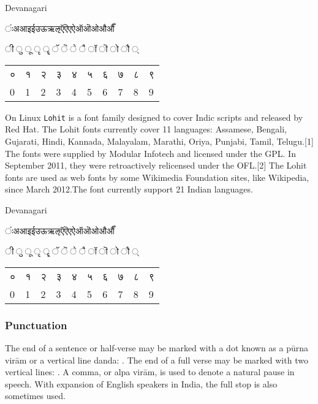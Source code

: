 \begin{scriptexample}[]{Devanagari}
{\begin{center}\parindent0pt\devanagari

ंःअआइईउऊऋऌऍऎएऐऑऒओऔऔँ \par 

ी	ु	ू	ृ	ॄ	ॅ	ॆ	े	ै	ॉ	ॊ	ो	ौ	्	\par

\bigskip		
\begin{tabular}{lll lll lll l}
०	&१	&२	&३	&४	&५	&६	&७	&८	&९\\
0	&1	&2	&3	&4	&5	&6	&7	&8	&9\\
\end{tabular}
\end{center}	
}
\end{scriptexample}


On Linux \texttt{Lohit} is a font family designed to cover Indic scripts and released by Red Hat. The Lohit fonts currently cover 11 languages: Assamese, Bengali, Gujarati, Hindi, Kannada, Malayalam, Marathi, Oriya, Punjabi, Tamil, Telugu.[1] The fonts were supplied by Modular Infotech and licensed under the GPL. In September 2011, they were retroactively relicensed under the OFL.[2] The Lohit fonts are used as web fonts by some Wikimedia Foundation sites, like Wikipedia, since March 2012.The font currently support 21 Indian languages. 



\begin{scriptexample}[]{Devanagari}
\begin{center}\parindent0pt\devanagarilohit

ंःअआइईउऊऋऌऍऎएऐऑऒओऔऔँ \par 

ी	ु	ू	ृ	ॄ	ॅ	ॆ	े	ै	ॉ	ॊ	ो	ौ	्	\par

\bigskip		
\begin{tabular}{lll lll lll l}
०	&१	&२	&३	&४	&५	&६	&७	&८	&९\\
0	&1	&2	&3	&4	&5	&6	&7	&8	&9\\
\end{tabular}
\end{center}
\end{scriptexample}

\subsubsection{Punctuation} 
The end of a sentence or half-verse may be marked with a dot known as a pūrna virām or a vertical line danda: \textbar. The end of a full verse may be marked with two vertical lines: \textbar\textbar. A comma, or alpa virām, is used to denote a natural pause in speech. With expansion of English speakers in India, the full stop is also sometimes used.

